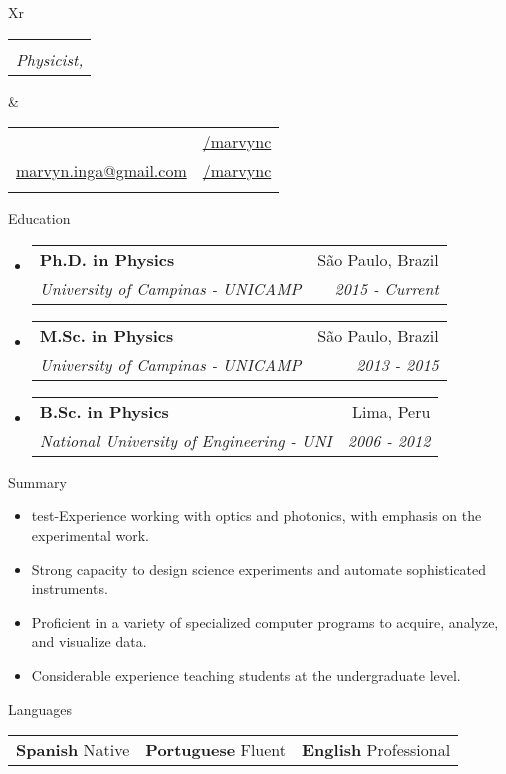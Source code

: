 \documentclass[letterpaper, 11pt]{article}[leftmargin=*]
\makeatletter
\def \fullname {\Huge Marvyn Inga}
\def \subtitle {Physicist, \faMale}
\def \linkedinicon {\faLinkedin}
\def \linkedinlink {https://www.linkedin.com/in/marvync/}
\def \linkedintext {/marvync}
\def \phoneicon {\faPhone}
\def \phonetext {+55-21-975106507}
\def \emailicon {\faEnvelope}
\def \emaillink {mailto:marvyn.inga@gmail.com}
\def \emailtext {marvyn.inga@gmail.com}
\def \githubicon {\faGithub}
\def \githublink {https://github.com/marvync}
\def \githubtext {/marvync}
\def \headertype {\doublecol} %
\def \linkedin {\linkedinicon \hspace{3pt}\href{\linkedinlink}{\linkedintext}}
\def \phone {\phoneicon \hspace{3pt}{ \phonetext}}
\def \email {\emailicon \hspace{3pt}\href{\emaillink}{\emailtext}}
\def \github {\githubicon \hspace{3pt}\href{\githublink}{\githubtext}}
\renewcommand{\section}[2]{
  \colorbox{boxcol}{\color{secondary}\raggedbottom\normalsize{#1}{\hspace{2pt}#2}}
}
\newcommand{\resumeEntryStart}{\begin{itemize}[leftmargin=2.5mm]\itemsep8pt}
\newcommand{\resumeEntryEnd}{\end{itemize}}
\newcommand{\resumeItemListStart}{\begin{itemize}[leftmargin=4.5mm]\itemsep-3pt}
\newcommand{\resumeItemListEnd}{\end{itemize}}
\newcommand{\resumeItem}[1]{
  \item\small{
    {#1}
  }
}
\newcommand{\resumeEntryTSDL}[4]{
  \item[]
    \begin{tabularx}{0.98\textwidth}{X@{\hspace{60pt}}r}
      \textbf{\color{primary}#1} & {\firabook\color{accent}\small#2} \\
      \vspace{-0.35cm}
      \textit{\color{accent}\small#3} & \textit{\color{accent}\small#4} \\
    \end{tabularx}\vspace{-0.35cm}
}
\newcommand{\resumeEntryS}[2]{
  \item[]\small{
    \textbf{\color{primary}#1 }{ #2 }
  }
}
\newcommand{\triplecol}[3]{
	\vspace{-0.3cm}
	\begin{tabularx}{\textwidth}{XXX}
	{\small#1} & {\small#2} & {\small#3}
	\end{tabularx}
}
\newcommand{\doublecol}[6]{
  \begin{tabularx}{\textwidth}{Xr}
    {
      \begin{tabular}[c]{l}
        \fontsize{35}{45}\selectfont{\color{primary}{{\textbf{\fullname}}}} \\
        {\textit{\subtitle}} %
      \end{tabular}
    } & {
      \begin{tabular}[c]{l@{\hspace{1.5em}}l}
        {\small#4} & {\small#1} \\
        {\small#5} & {\small#2} \\
        {\small#6} & {\small#3}
      \end{tabular}
    }
  \end{tabularx}
\vspace{0.3cm}
}
\newcommand{\singlecol}[6]{
  \begin{tabularx}{\textwidth}{Xr}
    {
      \begin{tabular}[b]{l}
        \fontsize{35}{45}\selectfont{\color{primary}{{\textbf{\fullname}}}} \\
        {\textit{\subtitle}} %
      \end{tabular}
    } & {
      \begin{tabular}[c]{l}
        {\small#1} \\
        {\small#2} \\
        {\small#3} \\
        {\small#4} \\
        {\small#5} \\
        {\small#6}
      \end{tabular}
    }
  \end{tabularx}
}
\makeatother
\begin{document}


\headertype{\linkedin}{\github}{}{\phone}{\email}{} %

\section{\faGraduationCap}{Education}
\resumeEntryStart
	\small
	\resumeEntryTSDL
    {Ph.D. in Physics}{\footnotesize São Paulo, Brazil}
	{\footnotesize University of Campinas - UNICAMP}{\footnotesize 2015 - Current}
	\resumeEntryTSDL
	{M.Sc. in Physics}{\footnotesize São Paulo, Brazil}
	{\footnotesize University of Campinas - UNICAMP}{\footnotesize 2013 - 2015}
	\resumeEntryTSDL
	{B.Sc. in Physics}{\footnotesize Lima, Peru}
	{\footnotesize National University of Engineering - UNI}{\footnotesize 2006 - 2012}
\resumeEntryEnd
\vspace{0.1cm}
\section{\faFolderOpen}{Summary}
\resumeItemListStart
\resumeItem {test-Experience working with optics and photonics, with emphasis on the experimental work.}
\resumeItem {Strong capacity to design science experiments and automate sophisticated instruments.}
\resumeItem {Proficient in a variety of specialized computer programs to acquire, analyze, and visualize data.}
\resumeItem {Considerable experience teaching students at the undergraduate level.}
\resumeItemListEnd

\section{\faComment}{Languages}
\vspace{-0.2cm}
\resumeEntryStart
	\small
	\triplecol{\resumeEntryS{Spanish}{Native}}{\resumeEntryS{Portuguese}{Fluent}}{\resumeEntryS{English} {Professional}}
\resumeEntryEnd
\end{document}
